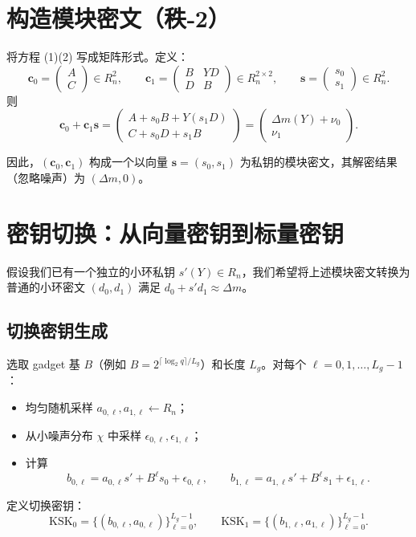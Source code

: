 \documentclass{article}
\begin{document}
\section{构造模块密文（秩‑2）}

将方程 (1)(2) 写成矩阵形式。定义：
\[
\mathbf{c}_0 = \begin{pmatrix} A \\ C \end{pmatrix} \in R_n^2, \qquad
\mathbf{c}_1 = \begin{pmatrix} B & Y D \\ D & B \end{pmatrix} \in R_n^{2\times 2}, \qquad
\mathbf{s} = \begin{pmatrix} s_0 \\ s_1 \end{pmatrix} \in R_n^2.
\]
则
\[
\mathbf{c}_0 + \mathbf{c}_1 \mathbf{s}
= \begin{pmatrix}
A + s_0 B + Y (s_1 D) \\
C + s_0 D + s_1 B
\end{pmatrix}
= \begin{pmatrix}
\Delta m(Y) + \nu_0 \\
\nu_1
\end{pmatrix}.
\]

因此，$(\mathbf{c}_0, \mathbf{c}_1)$ 构成一个以向量 $\mathbf{s} = (s_0, s_1)$ 为私钥的模块密文，其解密结果（忽略噪声）为 $(\Delta m, 0)$。

\section{密钥切换：从向量密钥到标量密钥}

假设我们已有一个独立的小环私钥 $s'(Y) \in R_n$，我们希望将上述模块密文转换为普通的小环密文 $(d_0, d_1)$ 满足 $d_0 + s' d_1 \approx \Delta m$。

\subsection{切换密钥生成}
选取 gadget 基 $B$（例如 $B = 2^{\lceil \log_2 q \rceil / L_g}$）和长度 $L_g$。对每个 $\ell = 0,1,\dots, L_g-1$：
\begin{itemize}
\item 均匀随机采样 $a_{0,\ell}, a_{1,\ell} \leftarrow R_n$；
\item 从小噪声分布 $\chi$ 中采样 $\epsilon_{0,\ell}, \epsilon_{1,\ell}$；
\item 计算
\[
b_{0,\ell} = a_{0,\ell} s' + B^\ell s_0 + \epsilon_{0,\ell}, \qquad
b_{1,\ell} = a_{1,\ell} s' + B^\ell s_1 + \epsilon_{1,\ell}.
\]
\end{itemize}
定义切换密钥：
\[
\mathrm{KSK}_0 = \{ (b_{0,\ell}, a_{0,\ell}) \}_{\ell=0}^{L_g-1}, \qquad
\mathrm{KSK}_1 = \{ (b_{1,\ell}, a_{1,\ell}) \}_{\ell=0}^{L_g-1}.
\]
\end{document}
